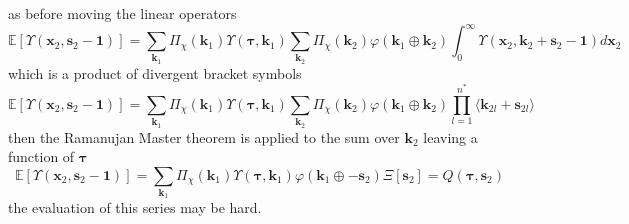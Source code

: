 \documentclass[journal=jcisd8,manuscript=article,layout=onecolumn,pdftex,floatfix,amsmath,amssymb,10pt]{achemso}
\begin{document}
as before moving the linear operators
\begin{equation}
\mathbb{E}[\Upsilon(\mathbf{x}_2,\mathbf{s}_2 - \mathbf{1})] =  \sum_{\mathbf{k}_1}\Pi_\chi(\mathbf{k}_1)\Upsilon(\boldsymbol\tau,\mathbf{k}_1)\sum_{\mathbf{k}_2} \Pi_\chi(\mathbf{k}_2) \varphi(\mathbf{k}_1 \oplus \mathbf{k}_2) \int_0^\infty\Upsilon(\mathbf{x}_2,\mathbf{k}_2 + \mathbf{s}_2 - \mathbf{1}) d\mathbf{x}_2
\end{equation}
which is a product of divergent bracket symbols
\begin{equation}
\mathbb{E}[\Upsilon(\mathbf{x}_2,\mathbf{s}_2 - \mathbf{1})] =  \sum_{\mathbf{k}_1}\Pi_\chi(\mathbf{k}_1)\Upsilon(\boldsymbol\tau,\mathbf{k}_1)\sum_{\mathbf{k}_2} \Pi_\chi(\mathbf{k}_2) \varphi(\mathbf{k}_1 \oplus \mathbf{k}_2) \prod_{l=1}^{n^*} \langle \mathbf{k}_{2l} + \mathbf{s}_{2l} \rangle
\end{equation}
then the Ramanujan Master theorem is applied to the sum over $\mathbf{k}_2$ leaving a function of $\boldsymbol\tau$
\begin{equation}
\mathbb{E}[\Upsilon(\mathbf{x}_2,\mathbf{s}_2 - \mathbf{1})] =  \sum_{\mathbf{k}_1}\Pi_\chi(\mathbf{k}_1)\Upsilon(\boldsymbol\tau,\mathbf{k}_1)\varphi(\mathbf{k}_1 \oplus -\mathbf{s}_2)\Xi[\mathbf{s}_2] = Q(\boldsymbol \tau,\mathbf{s}_2)
\end{equation}
the evaluation of this series may be hard.
\end{document}
